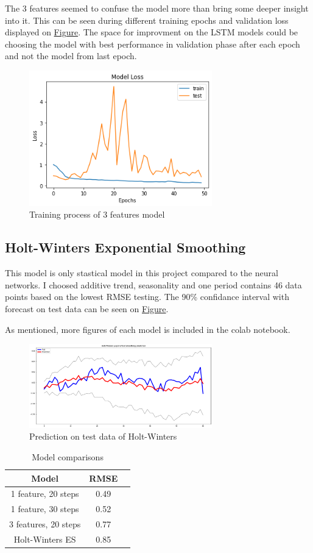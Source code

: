\documentclass[11pt]{article}
\begin{document}
The 3 features seemed to confuse the model more than bring some deeper insight into it. This can be seen during different training epochs and validation loss displayed on \hyperref[fig-training]{Figure}.
The space for improvment on the LSTM models could be choosing the model with best performance in validation phase after each epoch and not the model from last epoch.
\begin{figure}[h]
\centering
\includegraphics[width=300px]{model_loss_3feats.png}
\caption{\label{fig-training}Training process of 3 features model}
\end{figure}
\subsection{Holt-Winters Exponential Smoothing}
\label{sec:org77e2324}
This model is only stastical model in this project compared to the neural networks. I choosed additive trend, seasonality and one period contains 46 data points based on the lowest RMSE testing.
The 90\% confidance interval with forecast on test data can be seen on \hyperref[fig-holt]{Figure}.

As mentioned, more figures of each model is included in the colab notebook.
\begin{figure}[h]
\centering
\includegraphics[width=300px]{holt_val.png}
\caption{\label{fig-holt}Prediction on test data of Holt-Winters}
\end{figure}

\begin{table}[h]
\caption{\label{my-table}Model comparisons}
\centering
\begin{tabular}{|c|c|c|}
Model & RMSE\\
\hline
1 feature, 20 steps & 0.49\\
1 feature, 30 steps & 0.52\\
3 features, 20 steps & 0.77\\
Holt-Winters ES & 0.85\\
\end{tabular}
\end{table}
\end{document}
